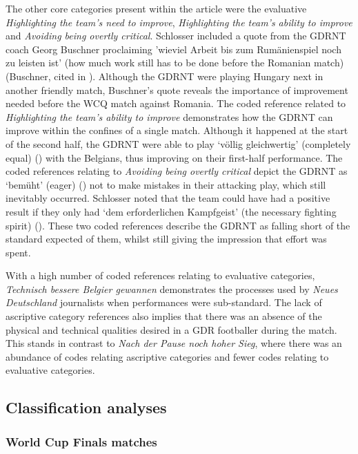 The other core categories present within the article were the evaluative \textit{Highlighting the team’s need to improve}, \textit{Highlighting the team’s ability to improve} and \textit{Avoiding being overtly critical}. Schlosser included a quote from the GDRNT coach Georg Buschner proclaiming 'wieviel Arbeit bis zum Rumänienspiel noch zu leisten ist' (how much work still has to be done before the Romanian match) (Buschner, cited in \cite{nd19730419}). Although the GDRNT were playing Hungary next in another friendly match, Buschner’s quote reveals the importance of improvement needed before the WCQ match against Romania. The coded reference related to \textit{Highlighting the team’s ability to improve} demonstrates how the GDRNT can improve within the confines of a single match. Although it happened at the start of the second half, the GDRNT were able to play ‘völlig gleichwertig’ (completely equal) (\cite{nd19730419}) with the Belgians, thus improving on their first-half performance. The coded references relating to \textit{Avoiding being overtly critical} depict the GDRNT as ‘bemüht’ (eager) (\cite{nd19730419}) not to make mistakes in their attacking play, which still inevitably occurred. Schlosser noted that the team could have had a positive result if they only had ‘dem erforderlichen Kampfgeist’ (the necessary fighting spirit) (\cite{nd19730419}). These two coded references describe the GDRNT as falling short of the standard expected of them, whilst still giving the impression that effort was spent.

With a high number of coded references relating to evaluative categories, \textit{Technisch bessere Belgier gewannen} demonstrates the processes used by \textit{Neues Deutschland} journalists when performances were sub-standard. The lack of ascriptive category references also implies that there was an absence of the physical and technical qualities desired in a GDR footballer during the match. This stands in contrast to \textit{Nach der Pause noch hoher Sieg}, where there was an abundance of codes relating ascriptive categories and fewer codes relating to evaluative categories.

\subsection*{Classification analyses}

\subsubsection*{World Cup Finals matches}

